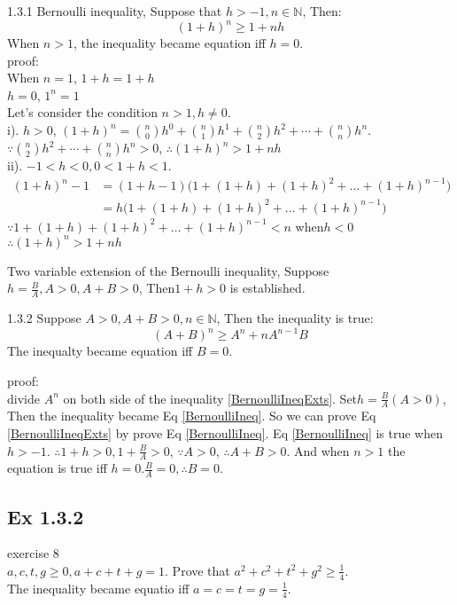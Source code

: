 	1.3.1 Bernoulli inequality, Suppose that $ h>-1, n\in\mathbb{N} $, Then:
	\begin{equation}\label{BernoulliIneq}
		(1+h)^n\ge1+nh
 	\end{equation}
 	When $ n>1 $, the inequality became equation iff $ h=0 $.\\
 	
 	proof:\\ 	
 	When $ n=1 $, $ 1+h=1+h $\\
 	$ h=0 $, $ 1^n=1 $\\
 	Let's consider the condition $ n>1, h\ne 0 $.\\
 	i). $ h>0 $, $ (1+h)^n = \binom{n}{0}h^0+\binom{n}{1}h^1+\binom{n}{2}h^2+\cdots + \binom{n}{n}h^n$.\\
 	$ \because \binom{n}{2}h^2+\cdots + \binom{n}{n}h^n >0 $, $ \therefore (1+h)^n > 1+nh $\\
 	ii). $ -1<h<0, 0<1+h<1 $.
 	\begin{align*}
 		(1+h)^n-1 &=(1+h-1)\Big(1+(1+h)+(1+h)^2+\dots+(1+h)^{n-1}\Big)\\
 		&=h\Big(1+(1+h)+(1+h)^2+\dots+(1+h)^{n-1}\Big)
 	\end{align*}
 	$ \because 1+(1+h)+(1+h)^2+\dots+(1+h)^{n-1} < n $ when$ h<0 $\\
 	$ \therefore (1+h)^n > 1+nh $
 	
 	Two variable extension of the Bernoulli inequality, Suppose
 	$ h = \frac{B}{A}, A>0, A+B>0 $, Then$ 1+h>0 $ is established.
 	
 	1.3.2 Suppose $ A>0, A+B>0, n\in\mathbb{N} $, Then the inequality is true:
 	\begin{equation}\label{BernoulliIneqExts}
 		(A+B)^n\ge A^n+nA^{n-1}B
 	\end{equation}
 	The inequalty became equation iff $ B=0 $.
 	
 	proof:\\
 	divide $ A^n $ on both side of the inequality \ref{BernoulliIneqExts}. Set$ h=\frac{B}{A} (A>0) $, Then the inequality became Eq \ref{BernoulliIneq}.
 	So we can prove Eq \ref{BernoulliIneqExts} by prove Eq \ref{BernoulliIneq}.
 	Eq \ref{BernoulliIneq} is true when $ h>-1 $. $ \therefore 1+h>0, 1+\frac{B}{A}>0 $, $ \because A>0 $, $ \therefore A+B>0 $. And when $ n>1 $ the equation is true iff $h=0 $.$ \frac{B}{A}=0,\therefore B=0 $.
 	
 	\subsection{Ex 1.3.2}
 	exercise 8\\
 	$ a,c,t,g \ge 0, a+c+t+g =1 $. Prove that $ a^2+c^2+t^2+g^2 \ge \frac{1}{4} $.\\ The inequality became equatio iff $ a=c=t=g=\frac{1}{4} $.\\
 	
